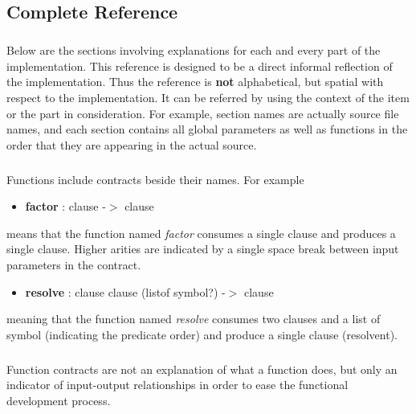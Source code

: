 \documentclass[11pt]{report}
\begin{document}
\begin{appendices}
 \chapter{Complete Reference}

\paragraph{} Below are the sections involving explanations for each and every part of the implementation. This reference is designed to be a direct informal reflection of the implementation. Thus the reference is \textbf{not} alphabetical, but spatial with respect to the implementation. It can be referred by using the context of the item or the part in consideration. For example, section names are actually source file names, and each section contains all global parameters as well as functions in the order that they are appearing in the actual source.

\paragraph{} Functions include contracts beside their names. For example

\begin{itemize}
 \item \textbf{factor} : clause -$>$ clause
\end{itemize}

means that the function named \textit{factor} consumes a single clause and produces a single clause. Higher arities are indicated by a single space break between input parameters in the contract.

\begin{itemize}
 \item \textbf{resolve} : clause clause (listof symbol?) -$>$ clause
\end{itemize}

meaning that the function named \textit{resolve} consumes two clauses and a list of symbol (indicating the predicate order) and produce a single clause (resolvent).

\paragraph{} Function contracts are not an explanation of what a function does, but only an indicator of input-output relationships in order to ease the functional development process.


\end{appendices}
\end{document}
